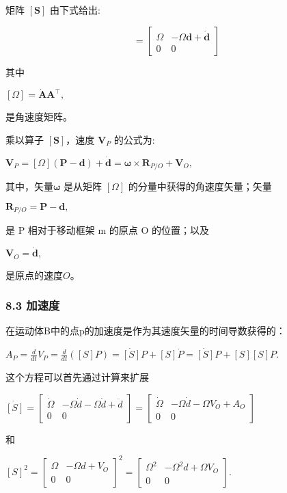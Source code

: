  矩阵 $[\mathbf{S}]$ 由下式给出:

\begin{equation}
[\mathbf{S}] = 
\begin{bmatrix}
\Omega & -\Omega \mathbf{d} + \dot{\mathbf{d}} \\
0 & 0 
\end{bmatrix}~
\end{equation}

其中

$[\Omega] = \dot{\mathbf{A}} \mathbf{A}^{\top},$

是角速度矩阵。

乘以算子 $[\mathbf{S}]$，速度 $\mathbf{V}_P$ 的公式为:

$\mathbf{V}_P = [\Omega](\mathbf{P} - \mathbf{d}) + \dot{\mathbf{d}} = \boldsymbol{\omega} \times \mathbf{R}_{P/O} +\mathbf{V}_O,$

其中，矢量$\boldsymbol{\omega}$ 是从矩阵 $[\Omega]$ 的分量中获得的角速度矢量；矢量

$\mathbf{R}_{P/O} = \mathbf{P} - \mathbf{d},$

是 P 相对于移动框架 m 的原点 O 的位置；以及

$\mathbf{V}_O = \dot{\mathbf{d}},$

是原点的速度$O$。

\subsubsection{8.3 加速度}

在运动体B中的点p的加速度是作为其速度矢量的时间导数获得的：

$A_P = \frac{d}{dt} V_P = \frac{d}{dt} \left( [S]P \right) = \dot{[S]} P + [S] \dot{P} = \dot{[S]} P + [S] [S] P.$

这个方程可以首先通过计算来扩展

$\dot{[S]} = \begin{bmatrix}
\dot{\Omega} & -\Omega \dot{d}  -\Omega \dot{d}+ \ddot{d} \\
0 & 0
\end{bmatrix} = \begin{bmatrix}
\dot{\Omega} & -\Omega \dot{d} - \Omega V_O + A_O \\
0 & 0
\end{bmatrix}$

和

$[S]^2 = \begin{bmatrix}
\Omega & -\Omega d + V_O \\
0 & 0
\end{bmatrix}^2 = \begin{bmatrix}
\Omega^2 & -\Omega^2 d + \Omega V_O \\
0 & 0
\end{bmatrix}.$

